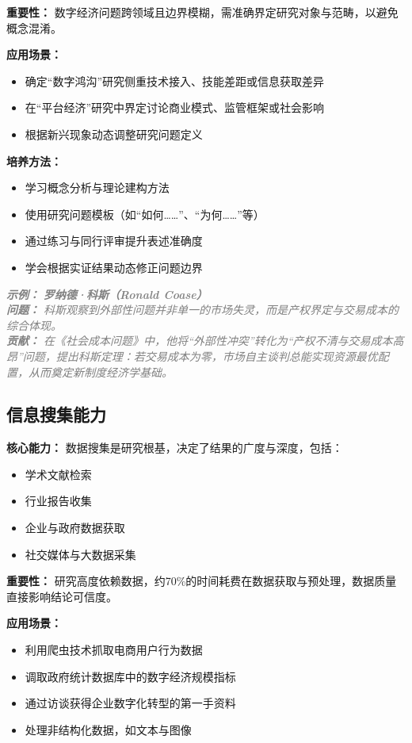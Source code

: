 \documentclass[lang=cn,12pt,a4paper]{elegantpaper}
\newcommand{\skillexample}[1]{\smallskip\noindent\textcolor{gray}{\textit{\footnotesize\textbf{示例：}} \textit{\footnotesize #1}}}
\begin{document}
\textbf{重要性：} 数字经济问题跨领域且边界模糊，需准确界定研究对象与范畴，以避免概念混淆。

\textbf{应用场景：} 
\begin{itemize}
    \item 确定“数字鸿沟”研究侧重技术接入、技能差距或信息获取差异
    \item 在“平台经济”研究中界定讨论商业模式、监管框架或社会影响
    \item 根据新兴现象动态调整研究问题定义
\end{itemize}

\textbf{培养方法：} 
\begin{itemize}
    \item 学习概念分析与理论建构方法
    \item 使用研究问题模板（如“如何……”、“为何……”等）
    \item 通过练习与同行评审提升表述准确度
    \item 学会根据实证结果动态修正问题边界
\end{itemize}

\skillexample{%
\textbf{罗纳德·科斯（Ronald Coase）}\\
\textbf{问题：} 科斯观察到外部性问题并非单一的市场失灵，而是产权界定与交易成本的综合体现。\\
\textbf{贡献：} 在《社会成本问题》中，他将“外部性冲突”转化为“产权不清与交易成本高昂”问题，提出科斯定理：若交易成本为零，市场自主谈判总能实现资源最优配置，从而奠定新制度经济学基础。}

\subsection{信息搜集能力}\label{sec:data_collection}
\textbf{核心能力：} 数据搜集是研究根基，决定了结果的广度与深度，包括：
\begin{itemize}
    \item 学术文献检索
    \item 行业报告收集
    \item 企业与政府数据获取
    \item 社交媒体与大数据采集
\end{itemize}

\textbf{重要性：} 研究高度依赖数据，约70\%的时间耗费在数据获取与预处理，数据质量直接影响结论可信度。

\textbf{应用场景：}
\begin{itemize}
    \item 利用爬虫技术抓取电商用户行为数据
    \item 调取政府统计数据库中的数字经济规模指标
    \item 通过访谈获得企业数字化转型的第一手资料
    \item 处理非结构化数据，如文本与图像
\end{itemize}
\end{document}

